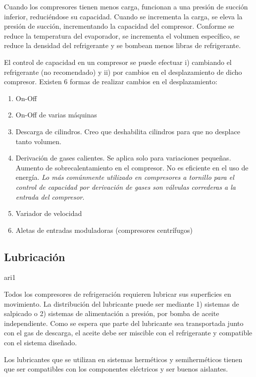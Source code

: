 Cuando los compresores tienen menos carga, funcionan a una presión de succión inferior, reduciéndose su capacidad. Cuando se incrementa la carga, se eleva la presión de succión, incrementando la capacidad del compresor. Conforme se reduce la temperatura del evaporador, se incrementa el volumen específico, se reduce la densidad del refrigerante y se bombean menos libras de refrigerante.


El control de capacidad en un compresor se puede efectuar i) cambiando el refrigerante (no recomendado) y ii) por cambios en el desplazamiento de dicho compresor. Existen 6 formas de realizar cambios en el desplazamiento:
\begin{enumerate}
    \item On-Off
    \item On-Off de varias máquinas
    \item Descarga de cilindros. Creo que deshabilita cilindros para que no desplace tanto volumen.
    \item Derivación de gases calientes. Se aplica solo para variaciones pequeñas. Aumento de sobrecalentamiento en el compresor. No es eficiente en el uso de energía. \emph{Lo más comúnmente utilizado en compresores a tornillo para el control de capacidad por derivación de gases son válvulas correderas a la entrada del compresor}.
    \item Variador de velocidad
    \item Aletas de entradas moduladoras (compresores centrífugos)
\end{enumerate}

\subsection{Lubricación}
\parencite{Pág. 201 R11-3}{ari1}



Todos los compresores de refrigeración requieren lubricar sus superficies en movimiento. La distribución del lubricante puede ser mediante 1) sistemas de salpicado o 2) sistemas de alimentación a presión, por bomba de aceite independiente. Como se espera que parte del lubricante sea transportada junto con el gas de descarga, el aceite debe ser miscible con el refrigerante y compatible con el sistema diseñado.


Los lubricantes que se utilizan en sistemas herméticos y semiherméticos tienen que ser compatibles con los componentes eléctricos y ser buenos aislantes.



